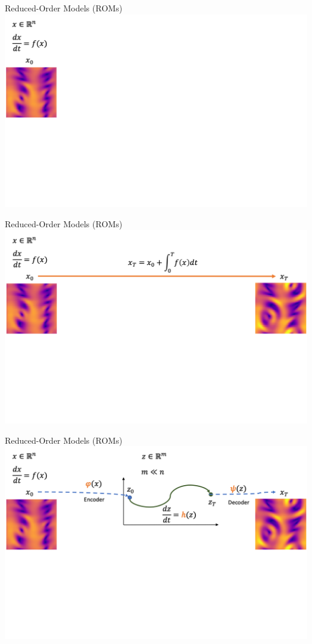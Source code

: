 \documentclass[8pt]{beamer}
\begin{document}
\begin{frame}{Reduced-Order Models (ROMs)}
\includegraphics[width=\textwidth]{Figures/roms_1}
\end{frame}

\begin{frame}{Reduced-Order Models (ROMs)}
\includegraphics[width=\textwidth]{Figures/roms_2}
\end{frame}

\begin{frame}{Reduced-Order Models (ROMs)}
\includegraphics[width=\textwidth]{Figures/roms_3}
\end{frame}
\end{document}
